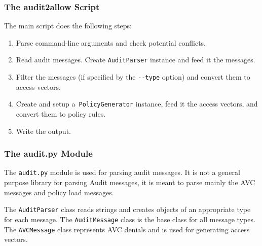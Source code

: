 \subsubsection{The audit2allow Script}

The main script does the following steps:
\begin{enumerate}
    \item Parse command-line arguments and check potential conflicts.
    \item Read audit messages. Create \texttt{AuditParser} instance and feed it
        the messages.
    \item Filter the messages (if specified by the \texttt{-{}-type} option) and
        convert them to access vectors.
    \item Create and setup a~\texttt{PolicyGenerator} instance, feed it the
        access vectors, and convert them to policy rules.
    \item Write the output.
\end{enumerate}

\subsubsection{The audit.py Module}

The \texttt{audit.py} module is used for parsing audit messages. It is not a
general purpose library for parsing Audit messages, it is meant to parse mainly
the AVC messages and policy load messages.

The \texttt{AuditParser} class reads strings and creates objects of an
appropriate type for each message. The \texttt{AuditMessage} class is the base
class for all message types. The \texttt{AVCMessage} class represents AVC
denials and is used for generating access vectors.

